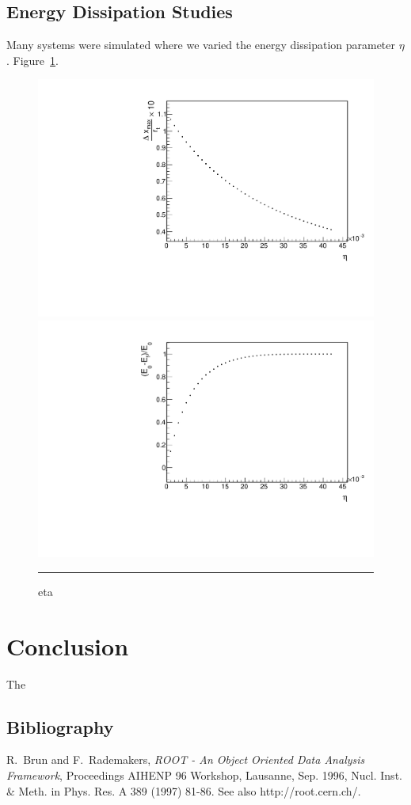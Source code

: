 \documentclass[aps,prl,floatfix,preprint,nofootinbib]{revtex4}
\begin{document}
\subsection{Energy Dissipation Studies}
Many systems were simulated where we varied the energy dissipation parameter $\eta$. Figure~\ref{fig:changing_eta}.
\begin{figure}[h!]
  \includegraphics[width=.45\linewidth]{plots/trend_plots/dxmax_vs_eta.pdf}
  \includegraphics[width=.45\linewidth]{plots/trend_plots/Eloss_vs_eta.pdf}
                  {\par\nobreak\rule[9pt]{35em}{0.5pt}\vspace{-5mm}}

                  \caption{eta}
                  \label{fig:changing_eta}
\end{figure}


\section{Conclusion}
The

\clearpage
\begin{thebibliography}{9}
  \section{Bibliography}
  R.~Brun and F.~Rademakers, \emph{ROOT - An Object Oriented Data Analysis Framework}, Proceedings AIHENP 96 Workshop, Lausanne, Sep. 1996, Nucl. Inst. \& Meth. in Phys. Res. A 389 (1997) 81-86. See also http://root.cern.ch/.

\end{thebibliography}

\clearpage

\end{document}
